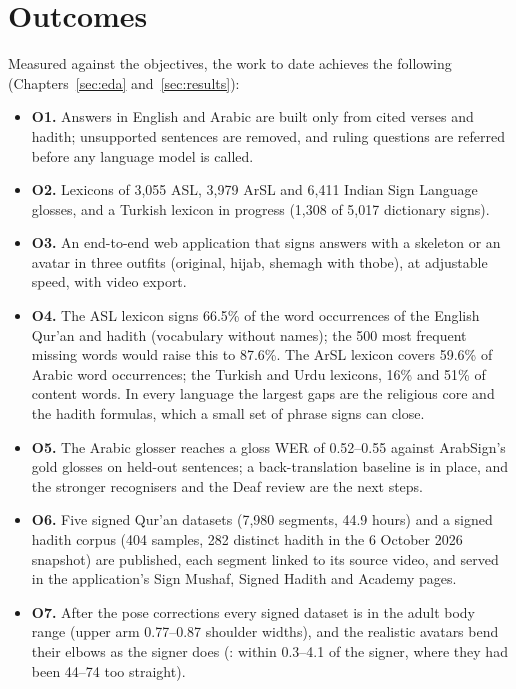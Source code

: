 \section{Outcomes}
Measured against the objectives, the work to date achieves the following (Chapters~\ref{sec:eda}
and~\ref{sec:results}):
\begin{itemize}[leftmargin=*,itemsep=1pt]
  \item \textbf{O1.} Answers in English and Arabic are built only from cited verses and hadith; unsupported sentences are
        removed, and ruling questions are referred before any language model is called.
  \item \textbf{O2.} Lexicons of 3,055 ASL, 3,979 ArSL and 6,411 Indian Sign Language glosses, and a Turkish lexicon in
        progress (1,308 of 5,017 dictionary signs).
  \item \textbf{O3.} An end-to-end web application that signs answers with a skeleton or an avatar in three outfits
        (original, hijab, shemagh with thobe), at adjustable speed, with video export.
  \item \textbf{O4.} The ASL lexicon signs 66.5\% of the word occurrences of the English Qur'an and hadith (vocabulary
        without names); the 500 most frequent missing words would raise this to 87.6\%. The ArSL lexicon covers 59.6\%
        of Arabic word occurrences; the Turkish and Urdu lexicons, 16\% and 51\% of content words. In every language the
        largest gaps are the religious core and the hadith formulas, which a small set of phrase signs can close.
  \item \textbf{O5.} The Arabic glosser reaches a gloss WER of 0.52--0.55 against ArabSign's gold glosses on held-out
        sentences; a back-translation baseline is in place, and the stronger recognisers and the Deaf review are the
        next steps.
  \item \textbf{O6.} Five signed Qur'an datasets (7,980 segments, 44.9 hours) and a signed hadith corpus (404 samples,
        282 distinct hadith in the 6 October 2026 snapshot) are published, each segment linked to its source video,
        and served in the application's Sign Mushaf, Signed Hadith and Academy pages.
  \item \textbf{O7.} After the pose corrections every signed dataset is in the adult body range (upper arm 0.77--0.87
        shoulder widths), and the realistic avatars bend their elbows as the signer does (: within
        0.3--4.1\textdegree{} of the signer, where they had been 44--74\textdegree{} too straight).
\end{itemize}

